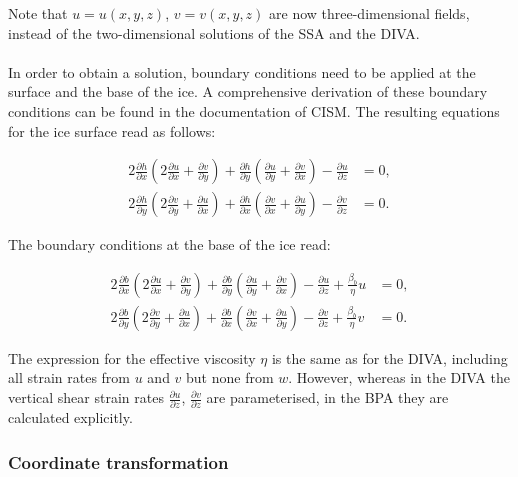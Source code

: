 \documentclass{article}
\begin{document}
Note that $u = u(x,y,z)$, $v = v(x,y,z)$ are now three-dimensional fields, instead of the two-dimensional solutions of the SSA and the DIVA.\\
\\
In order to obtain a solution, boundary conditions need to be applied at the surface and the base of the ice. A comprehensive derivation of these boundary conditions can be found in the documentation of CISM. The resulting equations for the ice surface read as follows:

\begin{align} \label{eq:BPA_02}
2 \frac{\partial h}{\partial x} \left( 2 \frac{\partial u}{\partial x} + \frac{\partial v}{\partial y} \right) + 
\frac{\partial h}{\partial y} \left( \frac{\partial u}{\partial y} + \frac{\partial v}{\partial x} \right) -
\frac{\partial u}{\partial z} &= 0, \\
2 \frac{\partial h}{\partial y} \left( 2 \frac{\partial v}{\partial y} + \frac{\partial u}{\partial x} \right) + 
\frac{\partial h}{\partial x} \left( \frac{\partial v}{\partial x} + \frac{\partial u}{\partial y} \right) -
\frac{\partial v}{\partial z} &= 0.
\end{align}

The boundary conditions at the base of the ice read:

\begin{align} \label{eq:BPA_03}
2 \frac{\partial b}{\partial x} \left( 2 \frac{\partial u}{\partial x} + \frac{\partial v}{\partial y} \right) + 
\frac{\partial b}{\partial y} \left( \frac{\partial u}{\partial y} + \frac{\partial v}{\partial x} \right) -
\frac{\partial u}{\partial z} + \frac{\beta_b}{\eta} u &= 0, \\
2 \frac{\partial b}{\partial y} \left( 2 \frac{\partial v}{\partial y} + \frac{\partial u}{\partial x} \right) + 
\frac{\partial b}{\partial x} \left( \frac{\partial v}{\partial x} + \frac{\partial u}{\partial y} \right) -
\frac{\partial v}{\partial z} + \frac{\beta_b}{\eta} v &= 0.
\end{align}

The expression for the effective viscosity $\eta$ is the same as for the DIVA, including all strain rates from $u$ and $v$ but none from $w$. However, whereas in the DIVA the vertical shear strain rates $\frac{\partial u}{\partial z}$, $\frac{\partial v}{\partial z}$ are parameterised, in the BPA they are calculated explicitly.

\subsubsection{Coordinate transformation}
\end{document}
